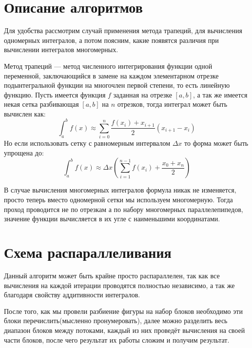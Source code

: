 \documentclass{report}
\begin{document}
\section*{Описание алгоритмов}
Для удобства рассмотрим случай применения метода трапеций, для вычисления одномерных интегралов, а потом поясним, какие появятся различия при вычислении интегралов многомерных.
\par Метод трапеций — метод численного интегрирования функции одной переменной, заключающийся в замене на каждом элементарном отрезке подынтегральной функции на многочлен первой степени, то есть линейную функцию. Пусть имеется функция $f$ заданная на отрезке $[a,b]$, а так же имеется некая сетка разбивающая $[a,b]$ на $n$ отрезков, тогда интеграл может быть вычислен как:
\[\int_{a}^{b}f(x)\approx \sum_{i=0}^{n}\frac{f(x_{i})+x_{i+1}}{2}(x_{i+1}-x_{i})\]
Но если использовать сетку с равномерным интервалом $\Delta x$ то форма может быть упрощена до:
\[\int_{a}^{b}f(x)\approx \Delta x(\sum_{i=1}^{n-1}f(x_{i})+\frac{x_{0}+x_{n}}{2})\]
\par В случае вычисления многомерных интегралов формула никак не изменяется, просто теперь вместо одномерной сетки мы используем многомерную. Тогда проход проводится не по отрезкам а по набору многомерных параллелепипедов, значение функции вычисляется в их угле с наименьшими координатами.
\newpage

\section*{Схема распараллеливания}
Данный алгоритм может быть крайне просто распараллелен, так как все вычисления на каждой итерации проводятся полностью независимо, а так же благодаря свойству аддитивности интегралов.
\par После того, как мы провели разбиение фигуры на набор блоков необходимо эти блоки перечислить(мысленно пронумеровать), далее можно разделить весь диапазон блоков между потоками, каждый из них проведёт вычисления на своей части блоков, после чего результат их работы сложим и получим результат.
\newpage

\end{document}
